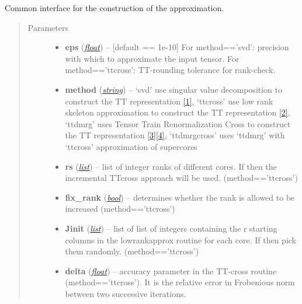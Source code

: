 \documentclass[a4paper,10pt,english]{sphinxmanual}
\begin{document}
\begin{fulllineitems}
\begin{fulllineitems}
\label{api-ttmat:TensorToolbox.core.TTmat.build}
Common interface for the construction of the approximation.
\begin{quote}\begin{description}
\item[{Parameters}] \leavevmode\begin{itemize}
\item {} 
\textbf{eps} (\href{http://docs.python.org/library/functions.html\#float}{\emph{float}}) -- {[}default == 1e-10{]} For method=='svd': precision with which to approximate the input tensor. For method=='ttcross': TT-rounding tolerance for rank-check.

\item {} 
\textbf{method} (\href{http://docs.python.org/library/string.html\#module-string}{\emph{string}}) -- `svd' use singular value decomposition to construct the TT representation {\hyperref[zrefs:oseledets2011]{{[}1{]}}}, `ttcross' use low rank skeleton approximation to construct the TT representation {\hyperref[zrefs:oseledets2010]{{[}2{]}}}, `ttdmrg' uses Tensor Train Renormalization Cross to construct the TT representation {\hyperref[zrefs:savostyanov2011]{{[}3{]}}}{\hyperref[zrefs:savostyanov2013]{{[}4{]}}}, `ttdmrgcross' uses `ttdmrg' with `ttcross' approximation of supercores

\item {} 
\textbf{rs} (\href{http://docs.python.org/library/functions.html\#list}{\emph{list}}) -- list of integer ranks of different cores. If  then the incremental TTcross approach will be used. (method=='ttcross')

\item {} 
\textbf{fix\_rank} (\href{http://docs.python.org/library/functions.html\#bool}{\emph{bool}}) -- determines whether the rank is allowed to be increased (method=='ttcross')

\item {} 
\textbf{Jinit} (\href{http://docs.python.org/library/functions.html\#list}{\emph{list}}) -- list of list of integers containing the r starting columns in the lowrankapprox routine for each core. If  then pick them randomly. (method=='ttcross')

\item {} 
\textbf{delta} (\href{http://docs.python.org/library/functions.html\#float}{\emph{float}}) -- accuracy parameter in the TT-cross routine (method=='ttcross'). It is the relative error in Frobenious norm between two successive iterations.


\end{itemize}
\end{description}
\end{quote}
\end{fulllineitems}
\end{fulllineitems}
\end{document}
